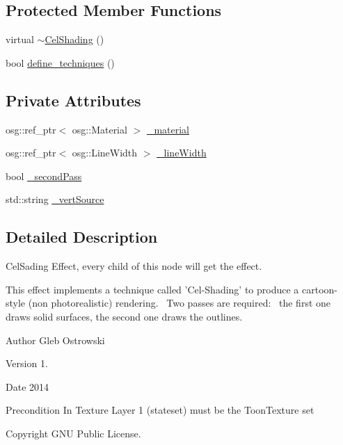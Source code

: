 \subsection*{Protected Member Functions}
\begin{DoxyCompactItemize}
\item 
virtual \hyperlink{classbrtr_1_1_cel_shading_ab6148e389081719d56d2971cc8924841}{$\sim$\+Cel\+Shading} ()
\item 
bool \hyperlink{classbrtr_1_1_cel_shading_a28212bb66f29ff8cf1169625b598b93b}{define\+\_\+techniques} ()
\end{DoxyCompactItemize}
\subsection*{Private Attributes}
\begin{DoxyCompactItemize}
\item 
osg\+::ref\+\_\+ptr$<$ osg\+::\+Material $>$ \hyperlink{classbrtr_1_1_cel_shading_ae67a870d7a985694fb0d3290f0163f84}{\+\_\+material}
\item 
osg\+::ref\+\_\+ptr$<$ osg\+::\+Line\+Width $>$ \hyperlink{classbrtr_1_1_cel_shading_ae1e0a4de3ca638da0fe0a3b3aa018f07}{\+\_\+line\+Width}
\item 
bool \hyperlink{classbrtr_1_1_cel_shading_a15226eda13f5a3deaee3260414f664bf}{\+\_\+second\+Pass}
\item 
std\+::string \hyperlink{classbrtr_1_1_cel_shading_a6c9ea02f1a90b0ba711394c4ff716081}{\+\_\+vert\+Source}
\end{DoxyCompactItemize}


\subsection{Detailed Description}
Cel\+Sading Effect, every child of this node will get the effect. 

This effect implements a technique called 'Cel-\/\+Shading' to produce a cartoon-\/style (non photorealistic) rendering.~\newline
 Two passes are required\+:~\newline
 the first one draws solid surfaces, the second one draws the outlines. \begin{DoxyAuthor}{Author}
Gleb Ostrowski 
\end{DoxyAuthor}
\begin{DoxyVersion}{Version}
1. 
\end{DoxyVersion}
\begin{DoxyDate}{Date}
2014 
\end{DoxyDate}
\begin{DoxyPrecond}{Precondition}
In Texture Layer 1 (stateset) must be the Toon\+Texture set 
\end{DoxyPrecond}
\begin{DoxyCopyright}{Copyright}
G\+N\+U Public License. 
\end{DoxyCopyright}



